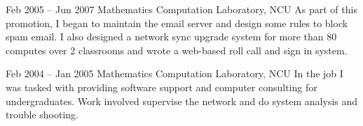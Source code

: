 \documentclass[10pt]{article} %
\begin{document}
\begin{paracol}{2}


  {Feb 2005 -- Jun 2007} %
  {Mathematics Computation Laboratory, NCU} %
  {As part of this promotion, I began to maintain the email server and design some rules to block spam email. I also designed a network sync upgrade system for more than 80 computes over 2 classrooms and wrote a web-based roll call and sign in system.} %



  {Feb 2004 -- Jan 2005} %
  {Mathematics Computation Laboratory, NCU} %
  {In the job I was tasked with providing software support and computer consulting for undergraduates. Work involved supervise the network and do system analysis and trouble shooting.}


  \switchcolumn %



\end{paracol}
\end{document}
